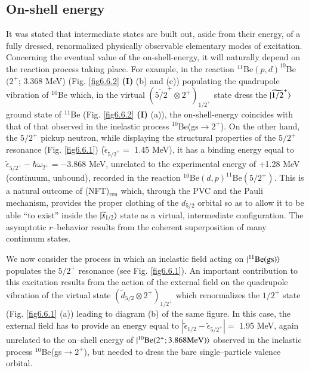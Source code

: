 \subsection{On-shell energy}
  It was stated that intermediate states are built out, aside from their energy, of a fully dressed, renormalized physically observable elementary modes of excitation. Concerning the eventual value of the on-shell-energy, it will naturally depend on the reaction process taking place.
For example, in the reaction $^{11}$Be$(p,d)^{10}$Be$(2^+$; 3.368 MeV) (Fig. \ref{fig6.6.2} \textbf{(I)} (b) and (e)) populating the quadrupole vibration of $^{10}$Be which, in the virtual $(\widetilde{5/2}^+\otimes 2^+)_{1/2^+}$ state dress the $|{\widetilde{1/2}^+} \rangle$ ground state of $^{11}$Be (Fig. \ref{fig6.6.2} \textbf{(I)} (a)), the on-shell-energy coincides with that of that observed in the inelastic process $^{10}$Be(gs$\to 2^+$). On the other hand, the $5/2^+$ pickup neutron, while displaying the structural properties of the $5/2^+$ resonance (Fig. \ref{fig6.6.1}) ($\tilde{\epsilon}_{{5/2}^+}=$ 1.45 MeV), it has a binding energy equal to $\tilde{\epsilon}_{{5/2}^+}-\hbar\omega_{2^+}=-3.868$ MeV, unrelated to the experimental energy of +1.28 MeV (continuum, unbound), recorded in the reaction $^{10}$Be$(d,p)^{11}$Be$(5/2^+)$. This is a natural outcome of (NFT)$_{\text{ren}}$ which, through the PVC and the Pauli mechanism, provides the proper clothing of the $d_{5/2}$ orbital so as to allow it to be able ``to exist'' inside the $|{\widetilde s_{1/2}} \rangle$ state as a virtual, intermediate configuration. The asymptotic $r$--behavior results from the coherent superposition of many continuum states.


 We now consider the process in which an inelastic field acting on $|{^{11}\text{Be(gs)}} \rangle$ populates the $5/2^+$ resonance (see Fig. \ref{fig6.6.1}). An important contribution to this excitation results from the action of the external field on the quadrupole vibration of the virtual state $(\tilde d_{5/2}\otimes 2^+)_{1/2^+}$ which renormalizes the $1/2^+$ state (Fig. \ref{fig6.6.1} (a)) leading to diagram (b) of the same figure. In this case, the external field has to provide an energy equal to $|\tilde \epsilon_{1/2}-\tilde \epsilon_{5/2^+}|=$ 1.95 MeV, again unrelated to the on--shell energy of $|{^{10}\text{Be}(2^+; 3.868\text{MeV})} \rangle$ observed in the inelastic process $^{10}$Be(gs$\to2^+$), but needed to dress the bare single--particle valence orbital.

